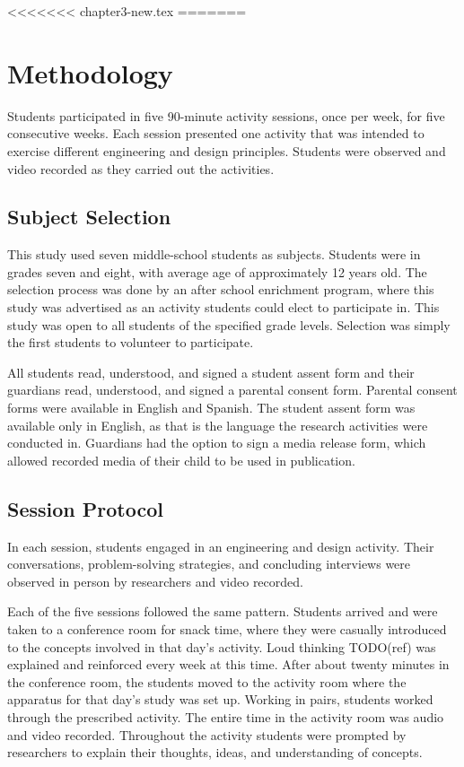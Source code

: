 <<<<<<< chapter3-new.tex
=======
\chapter{Methodology}

Students participated in five 90-minute activity sessions, once per week, for five consecutive weeks. Each session presented one activity that was intended to exercise different engineering and design principles. Students were observed and video recorded as they carried out the activities. 

\section{Subject Selection} 

This study used seven middle-school students as subjects. Students were in grades seven and eight, with average age of approximately 12 years old.  The selection process was done by an after school enrichment program, where this study was advertised as an activity students could elect to participate in.  This study was open to all students of the specified grade levels. Selection was simply the first students to volunteer to participate.

All students read, understood, and signed a student assent form and their guardians read, understood, and signed a parental consent form. Parental consent forms were available in English and Spanish. The student assent form was available only in English, as that is the language the research activities were conducted in. Guardians had the option to sign a media release form, which allowed recorded media of their child to be used in publication. 

\section{Session Protocol}

In each session, students engaged in an engineering and design activity. Their conversations, problem-solving strategies, and concluding interviews were observed in person by researchers and video recorded. 

Each of the five sessions followed the same pattern. Students arrived and were taken to a conference room for snack time, where they were casually introduced to the concepts involved in that day's activity. Loud thinking TODO(ref) was explained and reinforced every week at this time. After about twenty minutes in the conference room, the students moved to the activity room where the apparatus for that day's study was set up. Working in pairs, students worked through the prescribed activity. The entire time in the activity room was  audio and video recorded. Throughout the activity students were prompted by researchers to explain their thoughts, ideas, and understanding of concepts.


